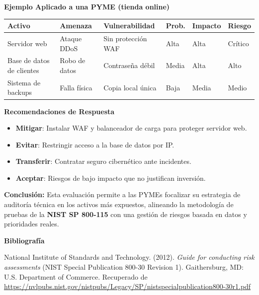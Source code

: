 \documentclass[a4paper, 11pt]{article}
\begin{document}
\vspace{0.5cm}
\textbf{Ejemplo Aplicado a una PYME (tienda online)}

\begin{center}
\begin{tabular}{|p{3cm}|p{3cm}|p{3cm}|p{2cm}|p{2cm}|p{2cm}|}
\hline
\rowcolor[HTML]{F4CCCC}
\textbf{Activo} & \textbf{Amenaza} & \textbf{Vulnerabilidad} & \textbf{Prob.} & \textbf{Impacto} & \textbf{Riesgo} \\
\hline
Servidor web & Ataque DDoS & Sin protección WAF & Alta & Alta & Crítico \\
\hline
Base de datos de clientes & Robo de datos & Contraseña débil & Media & Alta & Alto \\
\hline
Sistema de backups & Falla física & Copia local única & Baja & Media & Medio \\
\hline
\end{tabular}
\end{center}

\vspace{0.5cm}

\textbf{Recomendaciones de Respuesta}

\begin{itemize}
\item \textbf{Mitigar}: Instalar WAF y balanceador de carga para proteger servidor web.
\item \textbf{Evitar}: Restringir acceso a la base de datos por IP.
\item \textbf{Transferir}: Contratar seguro cibernético ante incidentes.
\item \textbf{Aceptar}: Riesgos de bajo impacto que no justifican inversión.
\end{itemize}

\vspace{0.5cm}

\textbf{Conclusión:} Esta evaluación permite a las PYMEs focalizar su estrategia de auditoría técnica en los activos más expuestos, alineando la metodología de pruebas de la \textbf{NIST SP 800-115} con una gestión de riesgos basada en datos y prioridades reales.

\vspace{0.8cm}

\textbf{Bibliografía}

National Institute of Standards and Technology. (2012). \textit{Guide for conducting risk assessments} (NIST Special Publication 800-30 Revision 1). Gaithersburg, MD: U.S. Department of Commerce. Recuperado de \url{https://nvlpubs.nist.gov/nistpubs/Legacy/SP/nistspecialpublication800-30r1.pdf}
\end{document}
